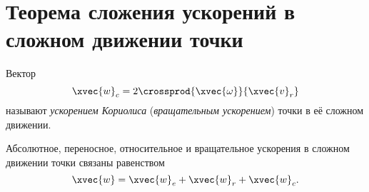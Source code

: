 \section{Теорема сложения ускорений в сложном движении точки}

\begin{definition}
  Вектор
  \begin{equation*}
    \xvec{w}_c = 2 \crossprod{\xvec{\omega}}{\xvec{v}_r}
  \end{equation*}
  называют \textit{ускорением Кориолиса} (\textit{вращательным ускорением})
  точки в её сложном движении.
\end{definition}

\begin{theorem}
  \label{theorem:coriolis_formula}
  Абсолютное, переносное, относительное и вращательное ускорения в сложном
  движении точки связаны равенством
  \begin{equation}
    \label{eq:acceleration_summation}
    \xvec{w} = \xvec{w}_e + \xvec{w}_r + \xvec{w}_c.
  \end{equation}
\end{theorem}

